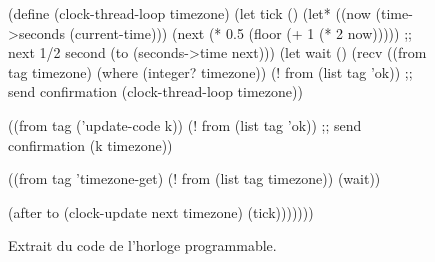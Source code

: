 \begin{figure}[ht]
  \centering\fontsize{8}{7}
\begin{mplisting}{0.75}
(define (clock-thread-loop timezone)
  (let tick ()
    (let* ((now (time->seconds (current-time)))
           (next (* 0.5 (floor (+ 1 (* 2 now))))) ;; next 1/2 second
           (to (seconds->time next)))
      (let wait ()
        (recv
          ((from tag timezone) (where (integer? timezone))
           (! from (list tag 'ok)) ;; send confirmation
           (clock-thread-loop timezone))

          ((from tag ('update-code k))
           (! from (list tag 'ok)) ;; send confirmation
           (k timezone))

          ((from tag 'timezone-get)
           (! from (list tag timezone))
           (wait))

          (after to
           (clock-update next timezone)
           (tick)))))))
\end{mplisting}
  \caption{Extrait du code de l'horloge programmable.}
  \label{fig:termite-clock@v1}
  \vspace*{4ex}
\end{figure}

